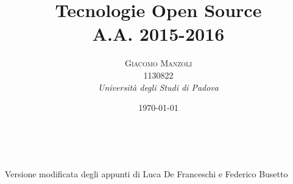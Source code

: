 \documentclass[a4paper, 11pt]{report} %
\title{\textbf{Tecnologie Open Source}\\ %
	A.A. 2015-2016 } %
\author{\textsc{Giacomo Manzoli}
	\\ 1130822 %
	\\{\textit{Università degli Studi di Padova}}} %
\date{\today} %
\makeatletter
\renewcommand{\maketitle}{ %
	\begin{flushright} %
		{\LARGE\@title} %
		
		\vspace{50pt} %
		
		{\large\@author} %
		\\\@date %
		
		\vspace{100pt} %
	\end{flushright}
}
\makeatother
\begin{document}
	
	\maketitle %
	
	\begin{center}
		Versione modificata degli appunti di Luca De Franceschi e Federico Busetto
	\end{center}
	
	
	
	\clearpage
	\tableofcontents
	\listofalgorithms
	
	
	\vspace{30pt} %
	
	\clearpage
	
	
	
	
	
	
	
	
	
	
	
	
	
\end{document}
